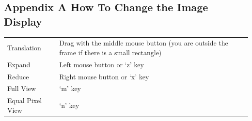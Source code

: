 \documentclass[a4paper,10pt]{article}
\begin{document}
\newpage

\subsection*{Appendix A How To Change the Image Display}

\setlength{\tabcolsep}{0em}
\renewcommand{\arraystretch}{1.0}
\noindent\begin{tabular}{p{8.5em}l}
Translation & Drag with the middle mouse button (you are outside the frame if there is a small rectangle)\\
Expand &  Left mouse button or ‘z' key\\
Reduce & Right mouse button or ‘x' key\\
Full View & ‘m' key\\
Equal Pixel View & ‘n' key\\
\end{tabular}
\end{document}
